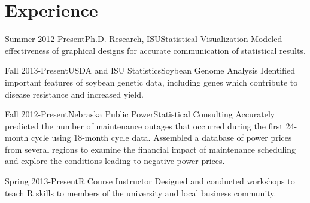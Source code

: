 \documentclass[10pt]{tccv}
\begin{document}
\section{Experience}
\begin{eventlist}
% 

\item{Summer 2012-Present}{Ph.D. Research, ISU}{Statistical Visualization}{
Modeled effectiveness of graphical designs for accurate communication of statistical results. 
}

\item{Fall 2013-Present}{USDA and ISU Statistics}{Soybean Genome Analysis}{
Identified important features of soybean genetic data, including genes which contribute to disease resistance and increased yield. 
}

\item{Fall 2012-Present}{Nebraska Public Power}{Statistical Consulting}{
Accurately predicted the number of maintenance outages that occurred during the first 24-month cycle using 18-month cycle data. Assembled a database of power prices from several regions to examine the financial impact of maintenance scheduling and explore the conditions leading to negative power prices.
}

\item{Spring 2013-Present}{\phantom{ISU}}{R Course Instructor\vspace{-14pt}}{
Designed and conducted workshops to teach R skills to members of the university and local business community. 
}


\end{eventlist}
\end{document}
